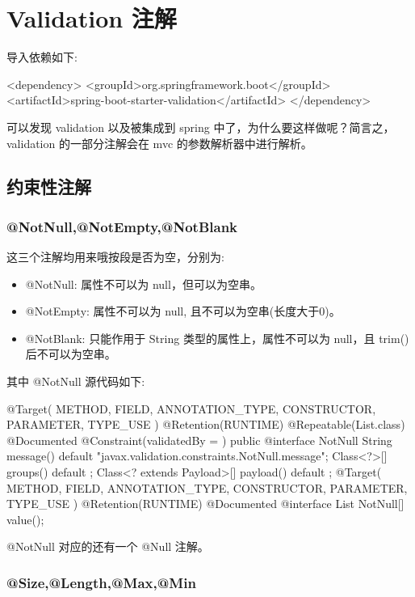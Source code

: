 \section{Validation 注解}

导入依赖如下:
\begin{xml}
<dependency>
    <groupId>org.springframework.boot</groupId>
    <artifactId>spring-boot-starter-validation</artifactId>
</dependency>
\end{xml}

可以发现 validation 以及被集成到 spring 中了，为什么要这样做呢？简言之，validation 的一部分注解会在 mvc 的参数解析器中进行解析。

\subsection{约束性注解}

\subsubsection{@NotNull,@NotEmpty,@NotBlank}

这三个注解均用来哦按段是否为空，分别为:
\begin{itemize}
    \item @NotNull: 属性不可以为 null，但可以为空串。
    \item @NotEmpty: 属性不可以为 null, 且不可以为空串(长度大于0)。
    \item @NotBlank: 只能作用于 String 类型的属性上，属性不可以为 null，且 trim() 后不可以为空串。
\end{itemize}

其中 @NotNull 源代码如下:
\begin{Java}
@Target({ METHOD, FIELD, ANNOTATION_TYPE, CONSTRUCTOR, PARAMETER, TYPE_USE })
@Retention(RUNTIME)
@Repeatable(List.class)
@Documented
@Constraint(validatedBy = { })
public @interface NotNull {
    String message() default "{javax.validation.constraints.NotNull.message}";
    Class<?>[] groups() default { };
    Class<? extends Payload>[] payload() default { };
    @Target({ METHOD, FIELD, ANNOTATION_TYPE, CONSTRUCTOR, PARAMETER, TYPE_USE })
    @Retention(RUNTIME)
    @Documented
    @interface List {
        NotNull[] value();
    }
}
\end{Java}

@NotNull 对应的还有一个 @Null 注解。

\subsubsection{@Size,@Length,@Max,@Min}

